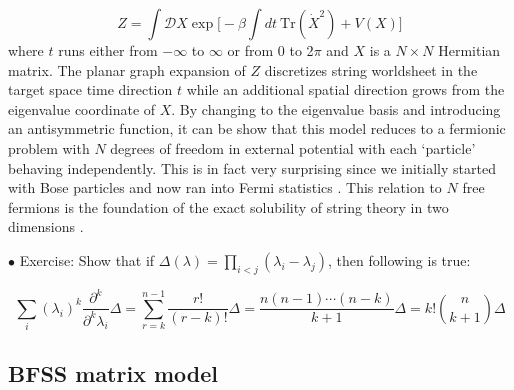 \documentclass[11pt]{article}
\begin{document}
\begin{equation}
	Z = \int \mathcal{D} X \exp \Bigg[-\beta \int dt~\mbox{Tr} (\dot{X}^2) + V(X) \Bigg]
\end{equation}
where $t$ runs either from $-\infty$ to $\infty$ or from 0 to 2$\pi$ and $X$ is a 
$ N \times N$ Hermitian matrix. The planar graph expansion of $Z$ discretizes string worldsheet in the target space time direction $t$ while an additional spatial direction  
grows from the eigenvalue coordinate of $X$. By changing to the eigenvalue basis and introducing an antisymmetric function, it can be show that this model reduces to a fermionic problem with $N$ degrees of freedom in external potential with each `particle' behaving independently. This is in fact very surprising since we initially started with Bose particles and now ran into Fermi statistics \cite{Brezin:1977sv,Kazakov:1988ch}. 
This relation to $N$ free fermions is the foundation of the exact solubility of string theory in two dimensions \cite{Klebanov:1991qa}. 

\vspace{10mm}

\begin{mdframed}[backgroundcolor=blue!3] 
	\textsc{} 
	$\bullet$ Exercise: Show that if $\Delta(\lambda) =\prod_{i<j} (\lambda_i - \lambda_j)$, then following is true: 
	
	\[ \sum_{i} (\lambda_i)^{k} \frac{\partial^{k}}{\partial^{k} \lambda_i} \Delta =
	 \sum_{r=k}^{n-1}\frac{r!}{(r-k)!} \Delta = \frac{n (n-1) \cdots (n-k)}{k+1}
	 \Delta = k! {{n}\choose{k+1}} \Delta
	 \]
\end{mdframed} 










\subsection{BFSS matrix model}
\end{document}

